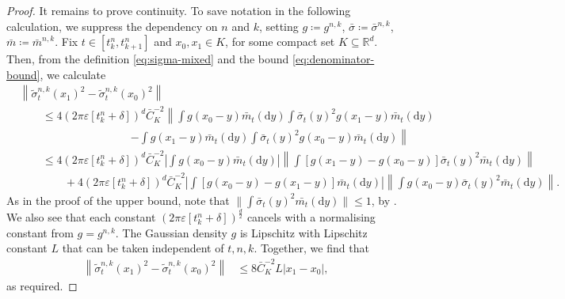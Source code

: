 \documentclass[12pt,oneside]{amsart}
\theoremstyle{definition}
\newcommand{\D}{\mathrm{d}}
\newcommand{\R}{\mathbb R}
\def\R{{\mathbb R}}
\numberwithin{equation}{section}
\begin{document}
\begin{proof}
	 It remains to prove continuity. To save notation in the following calculation, we suppress the dependency on $n$ and $k$, setting $g \coloneqq g^{n, k}$, $\bar{\sigma} \coloneqq \bar{\sigma}^{n, k}$, $\bar{m} \coloneqq \bar{m}^{n, k}$. Fix $t \in [t^n_k, t^n_{k + 1}]$ and $x_0, x_1 \in K$, for some compact set $K \subseteq \R^d$. Then, from the definition \eqref{eq:sigma-mixed} and the bound \eqref{eq:denominator-bound}, we calculate
	 \begin{equation}
	 	\begin{split}
		 	& \!\left\lVert \tilde{\sigma}^{n, k}_t(x_1)^2 - \tilde{\sigma}^{n, k}_t(x_0)^2 \right \rVert\\
		  	& \qquad \leq 4(2 \pi \varepsilon [t^n_k + \delta])^d\bar{C}_K^{-2}\!\left\lVert \int g(x_0 - y) \bar{m}_t(\D y) \int \bar \sigma_t(y)^2 g(x_1 - y) \bar{m}_t(\D y) \right .\\
		 	& \qquad \qquad \qquad \qquad \qquad \!\left. - \int g(x_1 - y) \bar{m}_t(\D y) \int \bar \sigma_t(y)^2g(x_0 - y) \bar{m}_t(\D y) \right\rVert\\
		 	& \qquad \leq 4(2 \pi \varepsilon [t^n_k + \delta])^d\bar{C}_K^{-2} \!\left \lvert \int g(x_0 - y) \bar{m}_t(\D y)  \right \rvert \!\left \lVert \int \!\left[ g(x_1 - y) - g(x_0 - y)\right]\! \bar \sigma_t(y)^2 \bar{m}_t(\D y) \right \rVert\\
		 	& \qquad \qquad + 4(2 \pi \varepsilon [t^n_k + \delta])^d\bar{C}_K^{-2} \!\left \lvert \int \!\left[ g(x_0 - y) - g(x_1 - y) \right]\! \bar{m}_t(\D y) \right\rvert \!\left \lVert \int g(x_0 - y) \bar \sigma_t(y)^2 \bar{m}_t(\D y) \right \rVert. 
	 	\end{split}
	 \end{equation}
	 As in the proof of the upper bound, note that $\lVert \int \bar \sigma_t(y)^2 \bar{m_t}(\D y) \rVert \leq 1$, by . We also see that each constant $(2 \pi \varepsilon [t^n_k + \delta])^\frac{d}{2}$ cancels with a normalising constant from $g = g^{n, k}$. The Gaussian density $g$ is Lipschitz with Lipschitz constant $L$ that can be taken independent of $t, n, k$. Together, we find that
	 \begin{equation}
	 	\begin{split}
	 		\!\left\lVert \tilde{\sigma}^{n, k}_t(x_1)^2 - \tilde{\sigma}^{n, k}_t(x_0)^2 \right \rVert & \leq 8 \bar C_K^{-2} L |x_1 - x_0|,
	 	\end{split}
	 \end{equation}
	 as required.
\end{proof}
\end{document}
